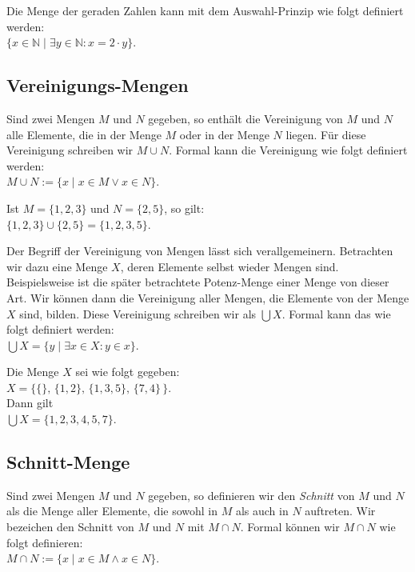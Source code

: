 \example
Die Menge der geraden Zahlen kann mit dem Auswahl-Prinzip wie folgt definiert werden: \\[0.2cm]
\hspace*{1.3cm} $\{ x \in \mathbb{N} \;|\; \exists y\in \mathbb{N}: x = 2 \cdot y \}$.  \eox

\subsection{Vereinigungs-Mengen}
Sind zwei Mengen $M$ und $N$ gegeben, so enth\"{a}lt die Vereinigung von $M$ und $N$ alle Elemente, die 
 in der Menge $M$ oder in der Menge $N$ liegen.  F\"{u}r diese Vereinigung schreiben wir $M \cup N$.
Formal kann die Vereinigung wie folgt definiert werden: \\[0.2cm]
\hspace*{1.3cm} $M \cup N := \{ x \;|\; x \in M \vee x \in N \}$. 
\vspace{0.2cm}

\example
Ist  $M = \{1,2,3\}$ und $N = \{2,5\}$, so gilt: \\[0.2cm]
\hspace*{1.3cm} $\{1,2,3\} \cup \{2,5\} = \{1,2,3,5\}$. 
\eox
\vspace{0.2cm}

\noindent
Der Begriff der Vereinigung von Mengen l\"{a}sst sich verallgemeinern.  Betrachten
wir dazu eine Menge $X$, deren Elemente selbst wieder Mengen sind. Beispielsweise ist die 
sp\"{a}ter betrachtete Potenz-Menge 
einer Menge von dieser Art.  Wir k\"{o}nnen dann die Vereinigung aller Mengen, die Elemente
von der Menge $X$ sind, bilden.  Diese Vereinigung schreiben wir als $\bigcup X$.  Formal
kann das wie folgt definiert werden: \\[0.2cm]
\hspace*{1.3cm} $\bigcup X = \{ y \;|\; \exists x \in X: y \in x \}$.

\example
Die Menge $X$ sei wie folgt gegeben: \\[0.2cm]
\hspace*{1.3cm} $X = \big\{ \{\},\, \{1,2\}, \, \{1,3,5\}, \, \{7,4\}\,\big\}$. \\[0.2cm]
Dann gilt \\[0.2cm]
\hspace*{1.3cm} $\bigcup X = \{ 1, 2, 3, 4, 5, 7 \}$.
\eox

\subsection{Schnitt-Menge}
Sind zwei Mengen $M$ und $N$ gegeben, so definieren wir den \emph{Schnitt} von
$M$ und $N$ als die Menge aller Elemente, die sowohl in $M$ als auch in $N$
auftreten.  Wir bezeichen den Schnitt von $M$ und $N$ mit $M \cap N$.
Formal k\"{o}nnen wir $M \cap N$ wie folgt definieren: \\[0.2cm]
\hspace*{1.3cm} $M \cap N := \{ x \mid x \in M \wedge x \in N \}$. 

